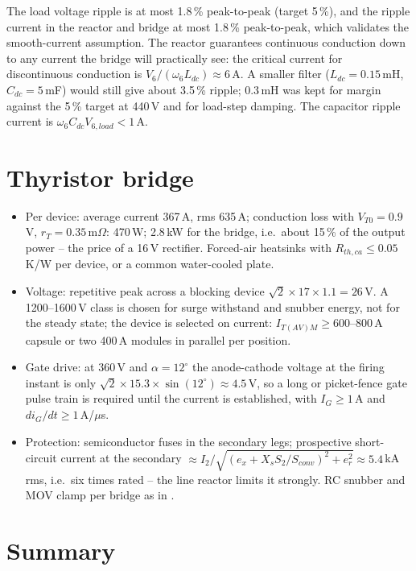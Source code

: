 \documentclass[11pt,a4paper]{article}
\newcommand{\ex}{e_x}
\begin{document}
The load voltage ripple is at most 1.8\,\% peak-to-peak (target 5\,\%), and the ripple current in the reactor and bridge at most 1.8\,\% peak-to-peak, which validates the smooth-current assumption. The reactor guarantees continuous conduction down to any current the bridge will practically see: the critical current for discontinuous conduction is $V_6/(\omega_6 L_{dc}) \approx 6$\,A. A smaller filter ($L_{dc} = 0.15$\,mH, $C_{dc} = 5$\,mF) would still give about 3.5\,\% ripple; 0.3\,mH was kept for margin against the 5\,\% target at 440\,V and for load-step damping. The capacitor ripple current is $\omega_6 C_{dc} V_{6,load} < 1$\,A.

\section{Thyristor bridge}
\label{sec:thy}

\begin{itemize}
\item Per device: average current 367\,A, rms 635\,A; conduction loss with $V_{T0} = 0.9$\,V, $r_T = 0.35$\,m$\Omega$: 470\,W; 2.8\,kW for the bridge, i.e.\ about 15\,\% of the output power -- the price of a 16\,V rectifier. Forced-air heatsinks with $R_{th,ca} \le 0.05$\,K/W per device, or a common water-cooled plate.
\item Voltage: repetitive peak across a blocking device $\sqrt2 \times 17 \times 1.1 = 26$\,V. A 1200--1600\,V class is chosen for surge withstand and snubber energy, not for the steady state; the device is selected on current: $I_{T(AV)M} \ge 600$--800\,A capsule or two 400\,A modules in parallel per position.
\item Gate drive: at 360\,V and $\alpha = 12^\circ$ the anode-cathode voltage at the firing instant is only $\sqrt2\times15.3\times\sin(12^\circ) \approx 4.5$\,V, so a long or picket-fence gate pulse train is required until the current is established, with $I_G \ge 1$\,A and $di_G/dt \ge 1$\,A/$\mu$s.
\item Protection: semiconductor fuses in the secondary legs; prospective short-circuit current at the secondary $\approx I_2/\sqrt{(\ex + X_s S_2/S_{conv})^2 + e_r^2} \approx 5.4$\,kA rms, i.e.\ six times rated -- the line reactor limits it strongly. RC snubber and MOV clamp per bridge as in \cite{snubber}.
\end{itemize}

\section{Summary}
\end{document}
